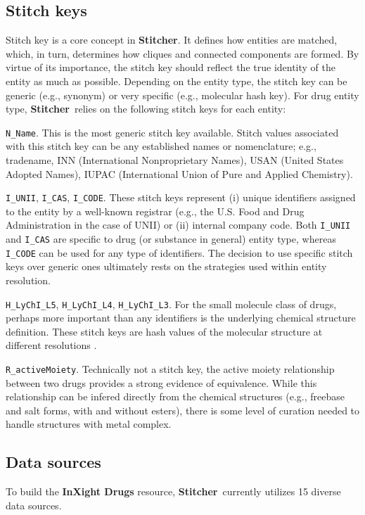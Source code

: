 \documentclass{bioinfo}
\newcommand\st{\textbf{Stitcher}}
\newcommand\ix{\textbf{InXight Drugs}}
\begin{document}
\subsection{Stitch keys}
Stitch key is a core concept in \st. It defines how entities are matched, which, in turn, determines how cliques and connected components are formed. By virtue of its importance, the stitch key should reflect the true identity of the entity as much as possible. Depending on the entity type, the stitch key can be generic (e.g., synonym) or very specific (e.g., molecular hash key). For drug entity type, \st\ relies on the following stitch keys for each entity:
\begin{unlist}
\item{\texttt{N\_Name}.} This is the most generic stitch key available. Stitch values associated with this stitch key can be any established names or nomenclature; e.g., tradename, INN (International Nonproprietary Names), USAN (United States Adopted Names), IUPAC (International Union of Pure and Applied Chemistry).
\item{\texttt{I\_UNII}, \texttt{I\_CAS}, \texttt{I\_CODE}.} These stitch keys represent (i) unique identifiers assigned to the entity by a well-known registrar (e.g., the U.S. Food and Drug Administration in the case of UNII) or (ii) internal company code. Both \texttt{I\_UNII} and \texttt{I\_CAS} are specific to drug (or substance in general) entity type, whereas \texttt{I\_CODE} can be used for any type of identifiers. The decision to use specific stitch keys over generic ones ultimately rests on the strategies used within entity resolution.
\item{\texttt{H\_LyChI\_L5}, \texttt{H\_LyChI\_L4}, \texttt{H\_LyChI\_L3}.} For the small molecule class of drugs, perhaps more important than any identifiers is the underlying chemical structure definition. These stitch keys are hash values of the molecular structure at different resolutions \citep{lychi2019}.
\item{\texttt{R\_activeMoiety}.} Technically not a stitch key, the active moiety relationship between two drugs provides a strong evidence of equivalence. While this relationship can be infered directly from the chemical structures (e.g., freebase and salt forms, with and without esters), there is some level of curation needed to handle structures with metal complex.
\end{unlist}

\subsection{Data sources}
To build the \ix{} resource, \st\ currently utilizes 15 diverse data sources.
\end{document}
